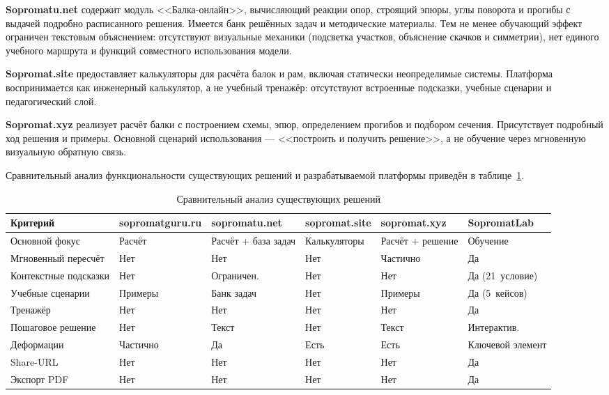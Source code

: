 \textbf{Sopromatu.net} содержит модуль <<Балка-онлайн>>, вычисляющий реакции опор, строящий эпюры, углы поворота и прогибы с выдачей подробно расписанного решения. Имеется банк решённых задач и методические материалы. Тем не менее обучающий эффект ограничен текстовым объяснением: отсутствуют визуальные механики (подсветка участков, объяснение скачков и симметрии), нет единого учебного маршрута и функций совместного использования модели.

\textbf{Sopromat.site} предоставляет калькуляторы для расчёта балок и рам, включая статически неопределимые системы. Платформа воспринимается как инженерный калькулятор, а не учебный тренажёр: отсутствуют встроенные подсказки, учебные сценарии и педагогический слой.

\textbf{Sopromat.xyz} реализует расчёт балки с построением схемы, эпюр, определением прогибов и подбором сечения. Присутствует подробный ход решения и примеры. Основной сценарий использования --- <<построить и получить решение>>, а не обучение через мгновенную визуальную обратную связь.

Сравнительный анализ функциональности существующих решений и разрабатываемой платформы приведён в таблице~\ref{tab:comparison}.

\begin{table}[H]
\caption{Сравнительный анализ существующих решений}\label{tab:comparison}
\small
\begin{tabularx}{\textwidth}{|p{3.5cm}|X|X|X|X|X|}
\hline
\textbf{Критерий} & \textbf{sopromat\-guru.ru} & \textbf{sopro\-matu.net} & \textbf{sopromat\-.site} & \textbf{sopromat\-.xyz} & \textbf{Sopromat\-Lab} \\
\hline
Основной фокус & Расчёт & Расчёт + база задач & Кальку\-ляторы & Расчёт + решение & Обучение \\
\hline
Мгновенный пересчёт & Нет & Нет & Нет & Частично & Да \\
\hline
Контекстные подсказки & Нет & Ограничен. & Нет & Нет & Да (21~условие) \\
\hline
Учебные сценарии & Примеры & Банк задач & Нет & Примеры & Да (5~кейсов) \\
\hline
Тренажёр & Нет & Нет & Нет & Нет & Да \\
\hline
Пошаговое решение & Нет & Текст & Нет & Текст & Интерак\-тив. \\
\hline
Деформации & Частично & Да & Есть & Есть & Ключевой элемент \\
\hline
Share-URL & Нет & Нет & Нет & Нет & Да \\
\hline
Экспорт PDF & Нет & Нет & Нет & Нет & Да \\
\hline
\end{tabularx}
\end{table}

